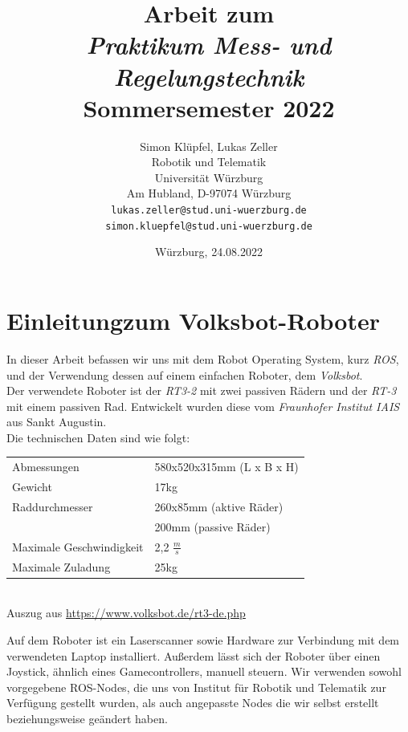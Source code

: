 \documentclass[11pt,a4paper]{article}
\begin{document}
\title{\Large\bf Arbeit zum \\ \textit{Praktikum Mess- und Regelungstechnik} \\ Sommersemester 2022}
\author{Simon Klüpfel, Lukas Zeller \\
  Robotik und Telematik \\
  Universität Würzburg\\
  Am Hubland, D-97074 Würzburg\\
\small \texttt{lukas.zeller@stud.uni-wuerzburg.de} \\
\small \texttt{simon.kluepfel@stud.uni-wuerzburg.de}}
\date{Würzburg, 24.08.2022}

\maketitle

\section{Einleitungzum Volksbot-Roboter}
In dieser Arbeit befassen wir uns mit dem Robot Operating System, kurz \textit{ROS}, und der 
Verwendung dessen auf einem einfachen Roboter, dem \textit{Volksbot}. \\
Der verwendete Roboter ist der \textit{RT3-2} mit zwei passiven Rädern und der \textit{RT-3} mit einem passiven Rad.
Entwickelt wurden diese vom \textit{Fraunhofer Institut IAIS} aus Sankt Augustin. \\
Die technischen Daten sind wie folgt: \\
\vspace{-5mm}
\begin{center}
\begin{tabular}{| p{5cm} p{5cm} |}
  \hline
  Abmessungen & 580x520x315mm (L x B x H) \\
  Gewicht & 17kg \\
  
  Raddurchmesser & 260x85mm (aktive Räder) \\
   & 200mm (passive Räder) \\
  Maximale Geschwindigkeit & 2,2 $\frac{m}{s}$ \\
  
  Maximale Zuladung & 25kg \\
  \hline
\end{tabular} \\
\small{ Auszug aus \url{https://www.volksbot.de/rt3-de.php}}
\end{center}
Auf dem Roboter ist ein Laserscanner sowie Hardware zur Verbindung mit dem verwendeten
Laptop installiert. Außerdem lässt sich der Roboter über einen Joystick, ähnlich eines Gamecontrollers, manuell steuern. 
Wir verwenden sowohl vorgegebene ROS-Nodes, die uns von Institut für Robotik und Telematik zur Verfügung gestellt wurden, als auch angepasste Nodes die wir selbst erstellt beziehungsweise
geändert haben. 
\end{document}
